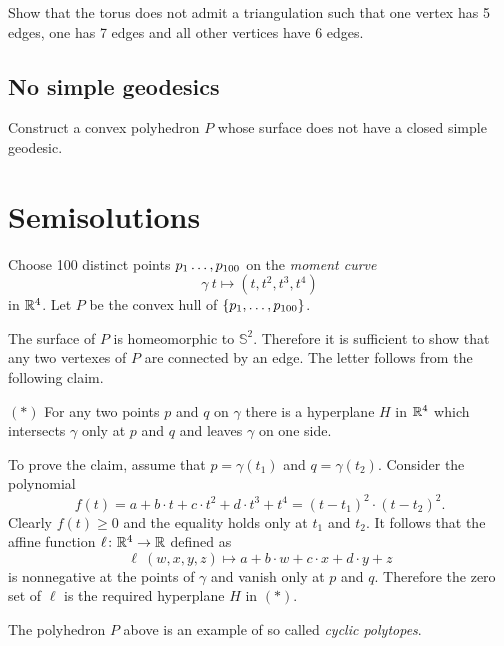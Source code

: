 \begin{pr}
Show that the torus does not admit a triangulation 
such that one vertex has 5 edges,
one has 7 edges and 
all other vertices have 
6 edges. 
\end{pr}


\subsection*{No simple geodesics\easy}\label{No simple geodesics}

\begin{pr}
Construct a convex polyhedron $P$ whose surface 
does not have a closed simple geodesic.
\end{pr}

\section*{Semisolutions}


Choose 100 distinct points $p_1\z\dots,p_{100}$
on the {}\emph{moment curve} 
\[\gamma\:t\mapsto (t,t^2,t^3,t^4)\] 
in $\mathbb{R}^4$.
Let $P$ be the convex hull of $\{p_1,\z\dots,p_{100}\}$.

The surface of $P$ is homeomorphic to $\mathbb{S}^2$.
Therefore it is sufficient to show that any two vertexes of $P$ are connected by an edge.
The letter follows from the following claim.

\begin{cl}{$({*})$}
For any two points $p$ and $q$ on $\gamma$ there is a hyperplane $H$ in $\mathbb{R}^4$ which intersects $\gamma$ only at $p$ and $q$ and leaves $\gamma$ on one side.
\end{cl}

To prove the claim, assume that $p=\gamma(t_1)$ and $q=\gamma(t_2)$. 
Consider the polynomial
\[f(t)=a+b\cdot t+c\cdot t^2+d\cdot t^3+t^4=(t-t_1)^2\cdot(t-t_2)^2.\]
Clearly $f(t)\ge 0$ and the equality holds only at $t_1$ and $t_2$.
It follows that the affine function $\ell\colon\mathbb{R}^4\to\mathbb{R}$ defined as 
\[\ell\:(w,x,y,z)\mapsto a+b\cdot w+c\cdot x+d\cdot y+z\]
is nonnegative at the points of $\gamma$ and vanish only at $p$ and $q$.
Therefore the zero set of $\ell$ is the required hyperplane $H$ in $({*})$. 
\qeds

The polyhedron $P$ above is an example 
of so called \emph{cyclic polytopes}.

